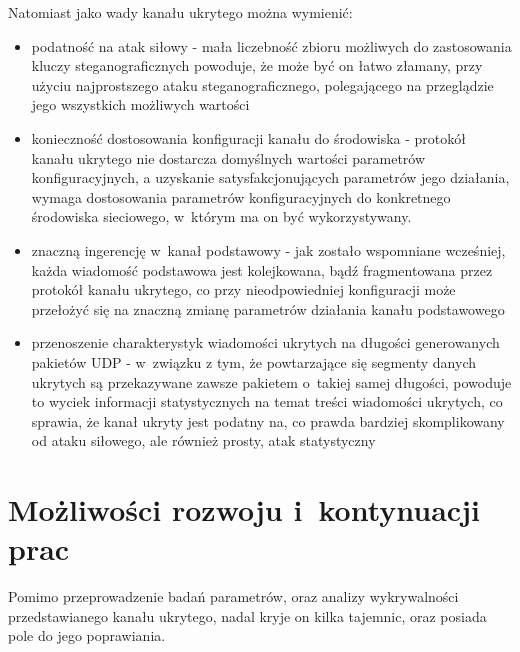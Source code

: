 \documentclass[a4paper, twoside, 12pt]{report}
\begin{document}
    Natomiast jako wady kanału ukrytego można wymienić:
    \begin{itemize}
        \item podatność na atak siłowy - mała liczebność zbioru możliwych do zastosowania
            kluczy steganograficznych powoduje, że może być on łatwo złamany,
            przy użyciu najprostszego ataku steganograficznego, polegającego
            na przeglądzie jego wszystkich możliwych wartości
        \item konieczność dostosowania konfiguracji kanału do środowiska - protokół
            kanału ukrytego nie dostarcza domyślnych wartości parametrów konfiguracyjnych, a
            uzyskanie satysfakcjonujących parametrów jego działania, wymaga dostosowania
            parametrów konfiguracyjnych do konkretnego środowiska sieciowego,
            w~którym ma on być wykorzystywany.
        \item znaczną ingerencję w~kanał podstawowy - jak zostało wspomniane wcześniej,
            każda wiadomość podstawowa jest kolejkowana, bądź fragmentowana przez
            protokół kanału ukrytego, co przy nieodpowiedniej konfiguracji może
            przełożyć się na znaczną zmianę parametrów działania kanału podstawowego
        \item przenoszenie charakterystyk wiadomości ukrytych na długości generowanych pakietów UDP -
            w~związku z tym, że powtarzające się segmenty danych ukrytych są przekazywane
            zawsze pakietem o~takiej samej długości, powoduje to wyciek informacji
            statystycznych na temat treści wiadomości ukrytych, co sprawia, że
            kanał ukryty jest podatny na, co prawda bardziej skomplikowany od ataku siłowego,
            ale również prosty, atak statystyczny

    \end{itemize}
\chapter{Możliwości rozwoju i~kontynuacji prac}
    Pomimo przeprowadzenie badań parametrów, oraz analizy wykrywalności przedstawianego kanału
    ukrytego, nadal kryje on kilka tajemnic, oraz posiada pole do jego poprawiania.
\end{document}
